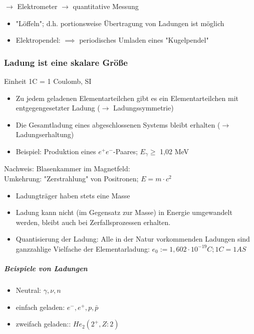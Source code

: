 \documentclass[11pt]{article}
\begin{document}
			$\rightarrow$ Elektrometer $\rightarrow$ quantitative Messung
			\begin{itemize}
				\item "Löffeln"; d.h. portionsweise Übertragung von Ladungen ist möglich
				\item Elektropendel: $\implies$ periodisches Umladen eines "Kugelpendel"
			\end{itemize}
			
			\subsubsection{Ladung ist eine skalare Größe } Einheit 1C = 1 Coulomb, SI
				\begin{itemize}
					\item Zu jedem geladenen Elementarteilchen gibt es ein Elementarteilchen mit entgegengesetzter Ladung ($\rightarrow$ Ladungssymmetrie)
					\item Die Gesamtladung eines abgeschlossenen Systems bleibt erhalten ($\rightarrow$ Ladungserhaltung)
					\item Beispiel: Produktion eines $ e^+e^- $-Paares; $ E_\gamma \geq $ 1,02 MeV
				\end{itemize}
				
				\newpage
				
				Nachweis: Blasenkammer im Magnetfeld:
				\linebreak\\
				Umkehrung: "Zerstrahlung" von Positronen; $E=m\cdot c^2$
				\begin{itemize}
					\item Ladungträger haben stets eine Masse
					\item Ladung kann nicht (im Gegensatz zur Masse) in Energie umgewandelt werden, bleibt auch bei Zerfallsprozessen erhalten.
					\item Quantisierung der Ladung: Alle in der Natur vorkommenden Ladungen sind ganzzahlige Vielfache der Elementarladung: $e_0:=1,602\cdot10^{-19}C; 1C=1AS$
				\end{itemize}
				\subparagraph{Beispiele von Ladungen}
				\begin{itemize}
					\item Neutral: $\gamma, \nu, n$
					\item einfach geladen: $e^-,e^+,p, \bar{p}$
					\item zweifach geladen:: $He_2(2^+,Z:2)$
				\end{itemize}	
				
\end{document}

